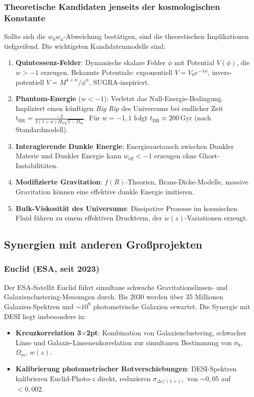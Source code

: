 ﻿\documentclass[a4paper,12pt]{article}
\theoremstyle{definition}
\theoremstyle{remark}
\begin{document}
\subsubsection*{Theoretische Kandidaten jenseits der kosmologischen Konstante}
Sollte sich die $w_0 w_a$-Abweichung bestätigen, sind die theoretischen
Implikationen tiefgreifend. Die wichtigsten Kandidatenmodelle sind:

\begin{enumerate}[label=\arabic*.]
  \item \textbf{Quintessenz-Felder}: Dynamische skalare Felder $\phi$ mit Potential
    $V(\phi)$, die $w > -1$ erzeugen. Bekannte Potentiale: exponentiell
    $V = V_0 e^{-\lambda\phi}$, invers-potentiell $V = M^{4+\alpha}/\phi^\alpha$,
    SUGRA-inspiriert.
  \item \textbf{Phantom-Energie} ($w < -1$): Verletzt das Null-Energie-Bedingung.
    Impliziert einen künftigen \textit{Big Rip} des Universums bei endlicher Zeit
    $t_\mathrm{BR} = \frac{-2}{3(1+w)H_0\sqrt{1-\Omega_m}}$. Für $w = -1{,}1$
    folgt $t_\mathrm{BR} \approx 200$\,Gyr (nach Standardmodell).
  \item \textbf{Interagierende Dunkle Energie}: Energieaustausch zwischen Dunkler
    Materie und Dunkler Energie kann $w_\mathrm{eff} < -1$ erzeugen ohne
    Ghost-Instabilitäten.
  \item \textbf{Modifizierte Gravitation}: $f(R)$-Theorien, Brans-Dicke-Modelle,
    massive Gravitation können eine effektive dunkle Energie imitieren.
  \item \textbf{Bulk-Viskosität des Universums}: Dissipative Prozesse im
    kosmischen Fluid führen zu einem effektiven Druckterm, der $w(z)$-Variationen
    erzeugt.
\end{enumerate}

\subsection{Synergien mit anderen Großprojekten}

\subsubsection*{Euclid (ESA, seit 2023)}
Der ESA-Satellit Euclid führt simultane schwache Gravitationslinsen- und
Galaxienclus\-tering-Messungen durch. Bis 2030 werden über 35 Millionen
Galaxien-Spektren und $\sim 10^9$ photometrische Galaxien erwartet. Die
Synergie mit DESI liegt insbesondere in:
\begin{itemize}
  \item \textbf{Kreuzkorrelation 3$\times$2pt}: Kombination von
    Galaxienclustering, schwacher Linse und Galaxie-Linsenenkorrelation
    zur simultanen Bestimmung von $\sigma_8$, $\Omega_m$, $w(z)$.
  \item \textbf{Kalibrierung photometrischer Rotverschiebungen}: DESI-Spektren
    kalibrieren Euclid-Photo-$z$ direkt, reduzieren $\sigma_{\Delta z/(1+z)}$
    von $\sim 0{,}05$ auf $< 0{,}002$.
\end{itemize}
\end{document}
